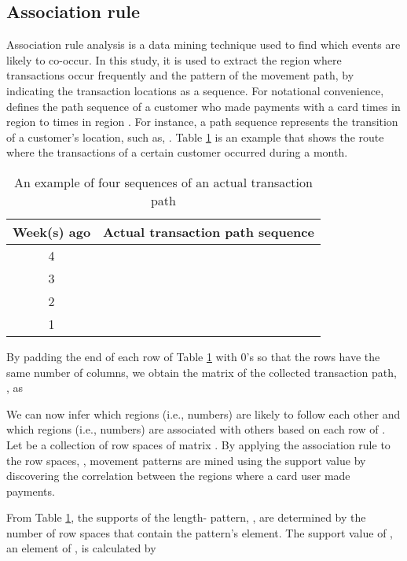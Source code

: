 \documentclass[final,authoryear,5p,times,twocolumn]{elsarticle}
\begin{document}
\subsection{Association rule}
\label{section:Sec3.4}
Association rule analysis is a data mining technique used to find which events are likely to co-occur. In this study, it is used to extract the region where transactions occur frequently and the pattern of the movement path, by indicating the transaction locations as a sequence. For notational convenience,  defines the path sequence of a customer who made payments with a card  times in region  to  times in region . For instance, a path sequence  represents the transition of a customer's location, such as, . Table \ref{tab:T1} is an example that shows the route where the transactions of a certain customer occurred during a month.
\begin{table}[h]
\begin{center}
    \begin{tabular}{c|c}
    Week(s) ago & Actual transaction path sequence                            \\ \hline
    4           &                   \\
    3           &  \\
    2           &        \\
    1           &                          \\
    \end{tabular}
    \caption {An example of four sequences of an actual transaction path}
    \label{tab:T1}
\end{center}
\end{table}

By padding the end of each row of Table \ref{tab:T1} with 0's so that the rows have the same number of columns, we obtain the  matrix of the collected transaction path, , as


We can now infer which regions (i.e., numbers) are likely to follow each other and which regions (i.e., numbers) are associated with others based on each row of . Let  be a collection of row spaces  of matrix . By applying the association rule to the row spaces, , movement patterns are mined using the support value by discovering the correlation between the regions where a card user made payments.

From Table \ref{tab:T1}, the supports of the length- pattern, , are determined by the number of row spaces that contain the pattern's element. The support value of , an element of , is calculated by
\end{document}
